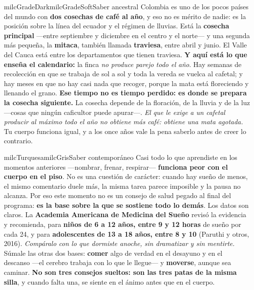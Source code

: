 \documentclass[11pt,letterpaper]{article}
\begin{document}
\begin{softbox}{milcGradeDark}{milcGradeSoft}{Saber ancestral}
Colombia es uno de los pocos países del mundo con \textbf{dos cosechas de café al año}, y eso no es mérito de nadie: es la posición sobre la línea del ecuador y el régimen de lluvias. Está la \textbf{cosecha principal} ---entre septiembre y diciembre en el centro y el norte--- y una segunda más pequeña, la \textbf{mitaca}, también llamada \textbf{traviesa}, entre abril y junio. El Valle del Cauca está entre los departamentos que tienen traviesa. \textbf{Y aquí está lo que enseña el calendario:} la finca \emph{no produce parejo todo el año}. Hay semanas de recolección en que se trabaja de sol a sol y toda la vereda se vuelca al cafetal; y hay meses en que no hay casi nada que recoger, porque la mata está floreciendo y llenando el grano. \textbf{Ese tiempo no es tiempo perdido: es donde se prepara la cosecha siguiente.} La cosecha depende de la floración, de la lluvia y de la luz ---cosas que ningún caficultor puede apurar---. \emph{El que le exige a un cafetal producir al máximo todo el año no obtiene más café: obtiene una mata agotada.} Tu cuerpo funciona igual, y a los once años vale la pena saberlo antes de creer lo contrario.
\end{softbox}

\begin{softbox}{milcTurquesa}{milcGris}{Saber contemporáneo}
Casi todo lo que aprendiste en los momentos anteriores ---nombrar, frenar, respirar--- \textbf{funciona peor con el cuerpo en el piso}. No es una cuestión de carácter: cuando hay sueño de menos, el mismo comentario duele más, la misma tarea parece imposible y la pausa no alcanza. Por eso este momento no es un consejo de salud pegado al final del programa: \textbf{es la base sobre la que se sostiene todo lo demás}. Los datos son claros. La \textbf{Academia Americana de Medicina del Sueño} revisó la evidencia y recomienda, para \textbf{niños de 6 a 12 años, entre 9 y 12 horas} de sueño por cada 24, y para \textbf{adolescentes de 13 a 18 años, entre 8 y 10} (Paruthi y otros, 2016). \emph{Compáralo con lo que dormiste anoche, sin dramatizar y sin mentirte.} Súmale las otras dos bases: \textbf{comer} algo de verdad en el desayuno y en el descanso ---el cerebro trabaja con lo que le llegue--- y \textbf{moverse}, aunque sea caminar. \textbf{No son tres consejos sueltos: son las tres patas de la misma silla}, y cuando falta una, se siente en el ánimo antes que en el cuerpo.
\end{softbox}
\end{document}

